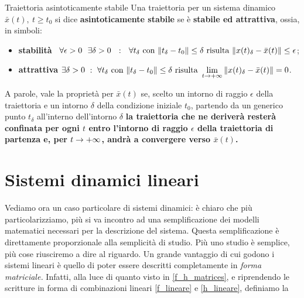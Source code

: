\documentclass[a4paper]{report}
\begin{document}
\begin{defin}{Traiettoria asintoticamente stabile}{}
Una traiettoria per un sistema dinamico $\bar x(t), \ t \geq t_0$ si dice \textbf{asintoticamente stabile} se è \textbf{stabile ed attrattiva}, ossia, in simboli:
\begin{itemize}
	\item \textbf{stabilità} \rarr \ $\forall \epsilon > 0 \ \  \exists \delta > 0 \ \ : \ \ \forall t_\delta \ \textrm{con} \ \norm{t_\delta - t_0} \leq \delta \ \textrm{risulta} \ \norm{x(t)_\delta -\bar x(t)} \leq \epsilon$; 
	\item \textbf{attrattiva} \rarr $\exists \delta > 0 \ : \ \forall t_\delta \ \textrm{con} \ \norm{t_\delta - t_0} \leq \delta \ \textrm{risulta} \ \displaystyle \lim_{t \rightarrow +\infty} \norm{x(t)_\delta -\bar x(t)} = 0$.
\end{itemize}
A parole, vale la proprietà per $\bar x(t)$ se, scelto un intorno di raggio $\epsilon$ della traiettoria e un intorno $\delta$ della condizione iniziale $t_0$, partendo da un generico punto $t_\delta$ all'interno dell'intorno $\delta$ \textbf{la traiettoria che ne deriverà resterà confinata per ogni $t$ entro l'intorno di raggio $\epsilon$ della traiettoria di partenza e, per $t \rightarrow +\infty$, andrà a convergere verso $\bar x(t)$.}
\end{defin}

\chapter{Sistemi dinamici lineari}
Vediamo ora un caso particolare di sistemi dinamici: è chiaro che più particolarizziamo, più si va incontro ad una semplificazione dei modelli matematici necessari per la descrizione del sistema. Questa semplificazione è direttamente proporzionale alla semplicità di studio. Più uno studio è semplice, più cose riusciremo a dire al riguardo.
\bb
Un grande vantaggio di cui godono i sistemi lineari è quello di poter essere descritti completamente in \textit{forma matriciale.} Infatti, alla luce di quanto visto in \eqref{f_h_matrices}, e riprendendo le scritture in forma di combinazioni lineari \eqref{f_lineare} e \eqref{h_lineare}, definiamo la
\end{document}
